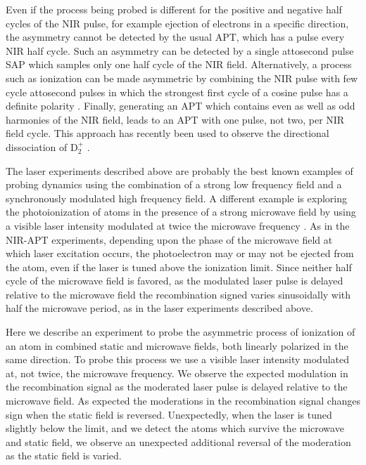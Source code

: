 \documentclass[aps,pra,preprint,groupedaddress]{revtex4-1}
\begin{document}
Even if the process being probed is different for the positive and negative half cycles of the NIR pulse, for example ejection of electrons in a specific direction, the asymmetry cannot be detected by the usual APT, which has a pulse every NIR half cycle. Such an asymmetry can be detected by a single attosecond pulse SAP which samples only one half cycle of the NIR field. Alternatively, a process such as ionization can be made asymmetric by combining the NIR pulse with few cycle attosecond pulses in which the strongest first cycle of a cosine pulse has a definite polarity \cite{Kubel}. Finally, generating an APT which contains even as well as odd harmonies of the NIR field, leads to an APT with one pulse, not two, per NIR field cycle. This approach has recently been used to observe the directional dissociation of D$_2^+$ \cite{Singhl}.

The laser experiments described above are probably the best known examples of probing dynamics using the combination of a strong low frequency field and a synchronously modulated high frequency field. A different example is exploring the photoionization of atoms in the presence of a strong microwave field by using a visible laser intensity modulated at twice the microwave frequency \cite{Overstreet, Carrat}. As in the NIR-APT experiments, depending upon the phase of the microwave field at which laser excitation occurs, the photoelectron may or may not be ejected from the atom, even if the laser is tuned above the ionization limit. Since neither half cycle of the microwave field is favored, as the modulated laser pulse is delayed relative to the microwave field the recombination signed varies sinusoidally with half the microwave period, as in the laser experiments described above.

Here we describe an experiment to probe the asymmetric process of ionization of an atom in combined static and microwave fields, both linearly polarized in the same direction. To probe this process we use a visible laser intensity modulated at, not twice, the microwave frequency. We observe the expected modulation in the recombination signal as the moderated laser pulse is delayed relative to the microwave field. As expected the moderations in the recombination signal changes sign when the static field is reversed. Unexpectedly, when the laser is tuned slightly below the limit, and we detect the atoms which survive the microwave and static field, we observe an unexpected additional reversal of the moderation as the static field is varied.
\end{document}
